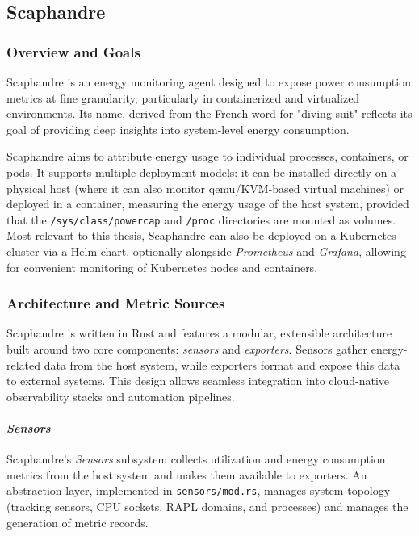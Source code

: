 \subsection{Scaphandre}
\label{sec:scaphandre}

\subsubsection{Overview and Goals}
\label{sec:scaphandre-overview}

Scaphandre\parencite{scaphandre_github} is an energy monitoring agent designed to expose power consumption metrics at fine granularity, particularly in containerized and virtualized environments. Its name, derived from the French word for "diving suit" reflects its goal of providing deep insights into system-level energy consumption.

Scaphandre aims to attribute energy usage to individual processes, containers, or pods. It supports multiple deployment models: it can be installed directly on a physical host (where it can also monitor qemu/KVM-based virtual machines) or deployed in a container, measuring the energy usage of the host system, provided that the \texttt{/sys/class/powercap} and \texttt{/proc} directories are mounted as volumes. Most relevant to this thesis, Scaphandre can also be deployed on a Kubernetes cluster via a Helm chart, optionally alongside \textit{Prometheus} and \textit{Grafana}, allowing for convenient monitoring of Kubernetes nodes and containers.

\subsubsection{Architecture and Metric Sources}
\label{sec:scaphandre-architecture}

Scaphandre is written in Rust and features a modular, extensible architecture built around two core components: \textit{sensors} and \textit{exporters}. Sensors gather energy-related data from the host system, while exporters format and expose this data to external systems. This design allows seamless integration into cloud-native observability stacks and automation pipelines.

\paragraph{\textit{Sensors}}

Scaphandre’s \textit{Sensors} subsystem collects utilization and energy consumption metrics from the host system and makes them available to exporters. An abstraction layer, implemented in \texttt{sensors/mod.rs}, manages system topology (tracking sensors, CPU sockets, RAPL domains, and processes) and manages the generation of metric records.

